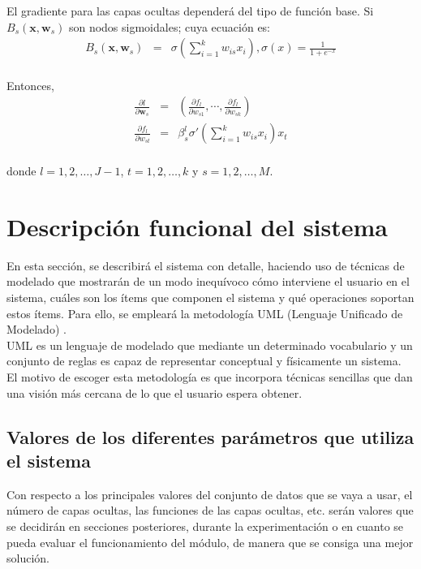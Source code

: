 		El gradiente para las capas ocultas dependerá del tipo de función base. Si $B_{s}(\mathbf{x},\mathbf{w}_s)$ son nodos sigmoidales; cuya ecuación es:\\
		
		\begin{eqnarray}
			B_{s}(\mathbf{x},\mathbf{w}_s) & = & \sigma\left(\sum_{i=1}^k w_{is} x_i\right), \sigma(x)=\frac{1}{1+e^{-x}}
		\end{eqnarray}\\

		Entonces,\\

		\begin{eqnarray}
			\frac{\partial l}{\partial \mathbf{w}_s} & = & \left(\frac{\partial f_{l}}{\partial w_{s1}}, \cdots, \frac{\partial f_{l}}{\partial w_{sk}}\right) \nonumber \\
			\frac{\partial f_{l}}{\partial w_{st}} & = & \beta_s^l\sigma'\left( \sum_{i=1}^k w_{is} x_i \right) x_t \nonumber
		\end{eqnarray}\\
		
		donde $l = 1, 2, \dots, J-1$, $t = 1, 2, \dots, k$ y $s = 1, 2, \dots, M$.
		
	\section{Descripción funcional del sistema}
	
		En esta sección, se describirá el sistema con detalle, haciendo uso de técnicas de modelado que mostrarán de un modo inequívoco cómo interviene el usuario en el sistema, cuáles son los ítems que componen el sistema y qué operaciones soportan estos ítems. Para ello, se empleará la metodología UML (Lenguaje Unificado de Modelado) \cite{UML}.\\
		
		UML es un lenguaje de modelado que mediante un determinado vocabulario y un conjunto de reglas es capaz de representar conceptual y físicamente un sistema. El motivo de escoger esta metodología es que incorpora técnicas sencillas que dan una visión más cercana de lo que el usuario espera obtener.
		
		\subsection{Valores de los diferentes parámetros que utiliza el sistema}

		Con respecto a los principales valores del conjunto de datos que se vaya a usar, el número de capas ocultas, las funciones de las capas ocultas, etc. serán valores que se decidirán en secciones posteriores, durante la experimentación o en cuanto se pueda evaluar el funcionamiento del módulo, de manera que se consiga una mejor solución.\\
		
